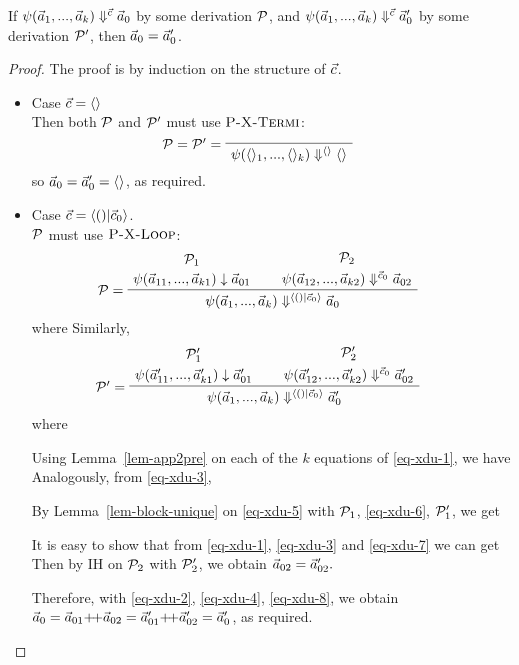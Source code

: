 \begin{lem} \label{lem-xducer-determ}
	If $\psi(\vec a_1,...,\vec a_{k}) \Downarrow^{\vec c} \vec a_0$ by some derivation $\mathcal{P}$,
	and $\psi(\vec a_1,...,\vec a_{k}) \Downarrow^{\vec c} \vec a'_0$ by some derivation $\mathcal{P}'$,
	then $\vec a_0 = \vec a'_0$.
\end{lem}

\begin{proof}
	The proof is by induction on the structure of $\vec c$. 
	\begin{itemize}
		\item Case $\vec c = \langle \rangle$ \\
		Then both $\mathcal{P}$ and $\mathcal{P}'$ must use $\textsc{P-X-Termi}$:
		$$\PT{ 
			 \LeLa{\MP = \MP' = }
			 \Axiom{\sevalf {\emptyv_1} {\emptyv_k} \emptyv \emptyv}
			}$$
		so $\vec a_0 = \vec a_0' = \langle \rangle$, as required.
		
		\item Case $\c = \< () | \c_0 \'>$. \\		
		$\mathcal{P}$ must use $\textsc{P-X-Loop}$:
		$$\PT{
			\UCN{\MP_1}{\block{\a_{11}}{\a_{k1}}{\a_{01}}}
			\UCN{\MP_2}{\sevalf{\a_{12}}{\a_{k2}}{\c_0}{\a_{02}}}
			\LeLa{\MP = }
			\BC{\sevalf{\a_1}{\a_k}{\< () | \c_0 \rangle}{\a_0}}
		}$$
		where 
		Similarly,
		$$\PT{
			\UCN{\MP'_1}{\block{\a'_{11}}{\a'_{k1}}{\a'_{01}}}
			\UCN{\MP'_2}{\sevalf{\a'_{12}}{\a'_{k2}}{\c_0}{\a'_{02}}}
			\LeLa{\MP' = }
			\BC{\sevalf{\a_1}{\a_k}{\< () | \c_0 \rangle}{\a'_0}}
		}$$
		where
		
		Using Lemma~\ref{lem-app2pre} on each of the $k$ equations of \eqref{eq-xdu-1}, we have 
		Analogously, from  \eqref{eq-xdu-3},
		
		By Lemma~\ref{lem-block-unique} on \eqref{eq-xdu-5} with
		$\mathcal{P}_1$, \eqref{eq-xdu-6}, $\mathcal{P}_1'$, we get
		
		It is easy to show that from \eqref{eq-xdu-1}, \eqref{eq-xdu-3} and \eqref{eq-xdu-7} we can get
		Then by IH on $\mathcal{P}_2$ with $\mathcal{P}_2'$, we obtain $\vec a_{02} = \vec a'_{02}.$
		
		Therefore, with \eqref{eq-xdu-2}, \eqref{eq-xdu-4}, \eqref{eq-xdu-8}, 
		we obtain $\a_0 = \a_{01} {\++} \a_{02} = \a'_{01} {\++} \a'_{02} = \a'_0$, as required.
	\end{itemize}
	
	
\end{proof}


